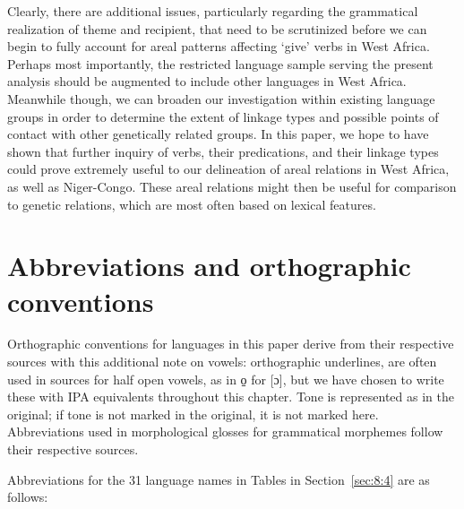\documentclass[output=paper,colorlinks,citecolor=brown]{langscibook}
\begin{document}
Clearly, there are additional issues, particularly regarding the grammatical realization of theme and recipient, that need to be scrutinized before we can begin to fully account for areal patterns affecting ‘give’ verbs in West Africa. Perhaps most importantly, the restricted language sample serving the present analysis should be augmented to include other languages in West Africa. Meanwhile though, we can broaden our investigation within existing language groups in order to determine the extent of linkage types and possible points of contact with other genetically related groups. In this paper, we hope to have shown that further inquiry of verbs, their predications, and their linkage types could prove extremely useful to our delineation of areal relations in West Africa, as well as Niger-Congo. These areal relations might then be useful for comparison to genetic relations, which are most often based on lexical features.


\section*{Abbreviations and orthographic conventions}

Orthographic conventions for languages in this paper derive from their respective sources with this additional note on vowels: orthographic underlines, are often used in sources for half open vowels, as in o̠ for [ɔ], but we have chosen to write these with IPA equivalents throughout this chapter. Tone is represented as in the original; if tone is not marked in the original, it is not marked here. Abbreviations used in morphological glosses for grammatical morphemes follow their respective sources.

Abbreviations for the 31 language names in Tables in Section~\ref{sec:8:4} are as follows:
\end{document}
